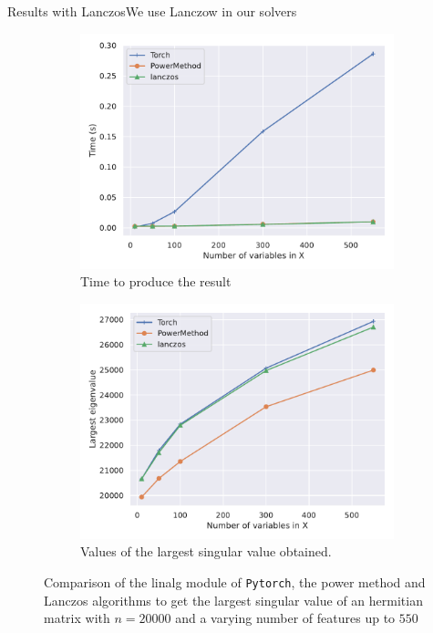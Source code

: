 \documentclass[10pt,aspectratio=43]{beamer}
\begin{document}
\begin{frame}{Results with Lanczos}{We use Lanczow in our solvers}

\begin{figure}[!h]
	\begin{subfigure}{.4\paperwidth}
		\includegraphics[width=\textwidth]{./prebuilt_images/benchmark_powermethod_scipy_n20000p550.pdf}
		\caption{Time to produce the result}
	\end{subfigure}
	\begin{subfigure}{.4\paperwidth}
		\includegraphics[width=\textwidth]{./prebuilt_images/benchmark_powermethod_scipy_values_n20000p550.pdf}
		\caption{Values of the largest singular value obtained.}
	\end{subfigure}
	\caption{Comparison of the linalg module of \texttt{Pytorch}, the power method and Lanczos algorithms to get the largest singular value of an hermitian matrix with $n=20000$ and a varying number of features up to $550$ }
	\label{fig:lanczos}
\end{figure}
\end{frame}
\end{document}
